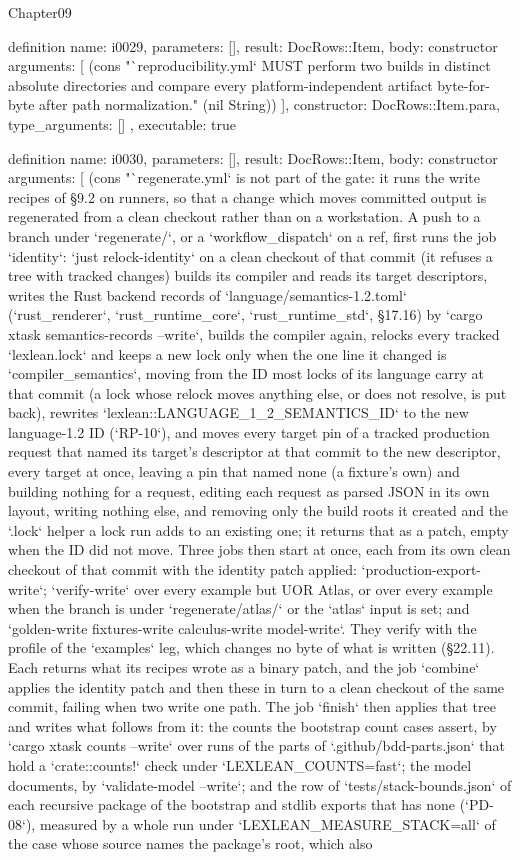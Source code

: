 \begin{lexlean}{Chapter09}
\begin{semanticmodule}
definition{
  name: i0029,
  parameters: [],
  result: DocRows::Item,
  body: constructor{
    arguments: [
      (cons "`reproducibility.yml` MUST perform two builds in distinct absolute directories and compare every platform-independent artifact byte-for-byte after path normalization." (nil String))
    ],
    constructor: DocRows::Item.para,
    type_arguments: []
  },
  executable: true
}

definition{
  name: i0030,
  parameters: [],
  result: DocRows::Item,
  body: constructor{
    arguments: [
      (cons "`regenerate.yml` is not part of the gate: it runs the write recipes of §9.2 on runners, so that a change which moves committed output is regenerated from a clean checkout rather than on a workstation. A push to a branch under `regenerate/`, or a `workflow_dispatch` on a ref, first runs the job `identity`: `just relock-identity` on a clean checkout of that commit (it refuses a tree with tracked changes) builds its compiler and reads its target descriptors, writes the Rust backend records of `language/semantics-1.2.toml` (`rust_renderer`, `rust_runtime_core`, `rust_runtime_std`, §17.16) by `cargo xtask semantics-records --write`, builds the compiler again, relocks every tracked `lexlean.lock` and keeps a new lock only when the one line it changed is `compiler_semantics`, moving from the ID most locks of its language carry at that commit (a lock whose relock moves anything else, or does not resolve, is put back), rewrites `lexlean::LANGUAGE_1_2_SEMANTICS_ID` to the new language-1.2 ID (`RP-10`), and moves every target pin of a tracked production request that named its target's descriptor at that commit to the new descriptor, every target at once, leaving a pin that named none (a fixture's own) and building nothing for a request, editing each request as parsed JSON in its own layout, writing nothing else, and removing only the build roots it created and the `.lock` helper a lock run adds to an existing one; it returns that as a patch, empty when the ID did not move. Three jobs then start at once, each from its own clean checkout of that commit with the identity patch applied: `production-export-write`; `verify-write` over every example but UOR Atlas, or over every example when the branch is under `regenerate/atlas/` or the `atlas` input is set; and `golden-write fixtures-write calculus-write model-write`. They verify with the profile of the `examples` leg, which changes no byte of what is written (§22.11). Each returns what its recipes wrote as a binary patch, and the job `combine` applies the identity patch and then these in turn to a clean checkout of the same commit, failing when two write one path. The job `finish` then applies that tree and writes what follows from it: the counts the bootstrap count cases assert, by `cargo xtask counts --write` over runs of the parts of `.github/bdd-parts.json` that hold a `crate::counts!` check under `LEXLEAN_COUNTS=fast`; the model documents, by `validate-model --write`; and the row of `tests/stack-bounds.json` of each recursive package of the bootstrap and stdlib exports that has none (`PD-08`), measured by a whole run under `LEXLEAN_MEASURE_STACK=all` of the case whose source names the package's root, which also }}
\end{semanticmodule}
\end{lexlean}

